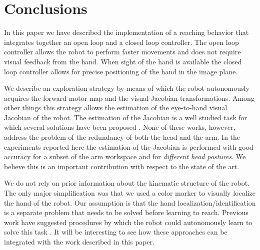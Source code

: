 \section{Conclusions}
In this paper we have described the implementation of a reaching
behavior that integrates together an open loop and a closed 
loop controller. The open loop controller
allows the robot to perform faster movements and does not require visual 
feedback from the hand. When sight of the hand is available the closed
loop controller allows for precise positioning of the hand in the 
image plane. 

We describe an exploration strategy by means of which the robot autonomously 
acquires the forward motor map and the visual Jacobian transformations. 
Among other things this strategy 
allows the estimation of the eye-to-hand visual Jacobian of the robot. 
The estimation of the Jacobian is a well studied task for which several 
solutions have been proposed \cite{Hosoda94versatile,Mansard06jacobian,
Lapreste04efficient}. None of these works, however, address the 
problem of the redundancy of both the head and the arm. In the experiments 
reported here the estimation of the Jacobian is performed with good 
accuracy for a subset of the arm workspace and for 
\emph{different head postures}. We believe
this is an important contribution with respect to the state of the art.

We do not rely on prior information about the 
kinematic structure of the robot. The only major simplification was that 
we used a color marker to visually localize the hand of the robot. 
Our assumption
is that the hand localization/identification is a separate problem
that needs to be solved before learning to reach. Previous work have 
suggested procedures by which 
the robot could autonomously learn to solve this task 
\cite{Natale05,edsinger06what}. It will be interesting to see
how these approaches can be integrated with the work described 
in this paper.
